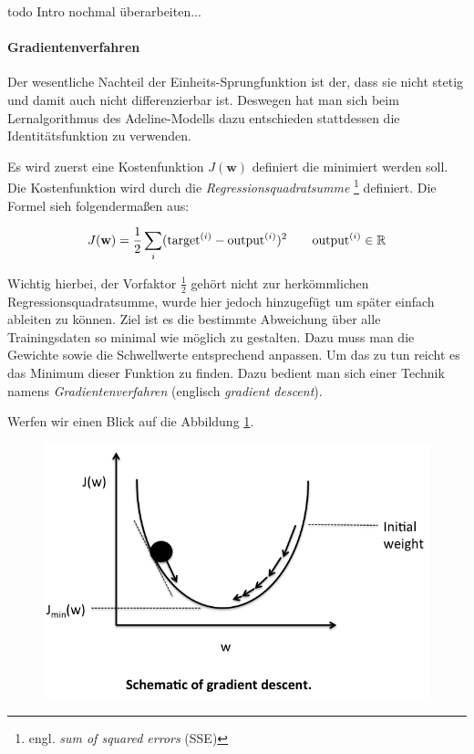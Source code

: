 todo Intro nochmal überarbeiten...

\paragraph{Gradientenverfahren}
Der wesentliche Nachteil der Einheits-Sprungfunktion ist der, dass sie nicht stetig und damit auch nicht differenzierbar ist. Deswegen hat man sich beim Lernalgorithmus des Adeline-Modells dazu entschieden stattdessen die Identitätsfunktion zu verwenden. 

Es wird zuerst eine Kostenfunktion $J(\mathbf{w})$ definiert die minimiert werden soll. Die Kostenfunktion wird durch die \emph{Regressionsquadratsumme} \footnote{engl. \emph{sum of squared errors} (SSE)} definiert. Die Formel sieh folgendermaßen aus: 

\begin{equation}
J(\mathbf{w})  = \frac{1}{2} \sum_{i} (\text{target}^{(i)} - \text{output}^{(i)})^2 \quad \quad \text{output}^{(i)} \in \mathbb{R} \\
\end{equation}

Wichtig hierbei, der Vorfaktor $ \frac{1}{2} $ gehört nicht zur herkömmlichen Regressionsquadratsumme, wurde hier jedoch hinzugefügt um später einfach ableiten zu können. Ziel ist es die bestimmte Abweichung über alle Trainingsdaten so minimal wie möglich zu gestalten. Dazu muss man die Gewichte sowie die Schwellwerte entsprechend anpassen. Um das zu tun reicht es das Minimum dieser Funktion zu finden. Dazu bedient man sich einer Technik namens \emph{Gradientenverfahren} (englisch \emph{gradient descent}). 

Werfen wir einen Blick auf die Abbildung \ref{fig:ad_gd1}. 

\begin{figure}[!htb]
	\centering
	\includegraphics[width=.7\linewidth]{img/adeline_gd1}
	\label{fig:ad_gd1}
\end{figure}

